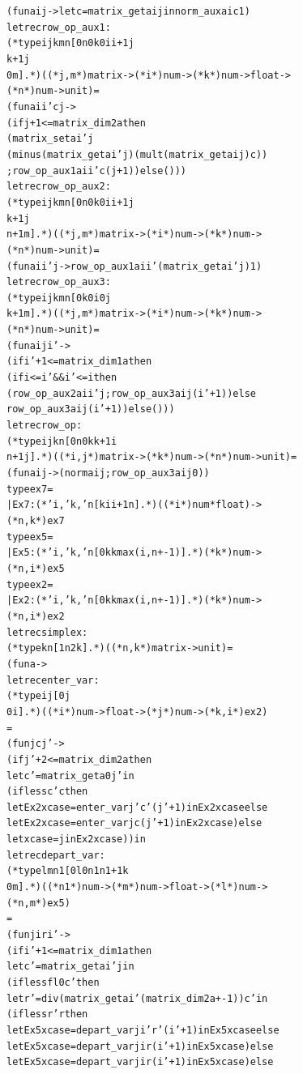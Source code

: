 \documentclass{article}
\newenvironment{tmcode}[1][]{\begin{alltt}}{\end{alltt}}
\begin{document}
\begin{tmcode}
  (fun a i j -> let c = matrix_get a i j in norm_aux a i c 1)
let rec row_op_aux1 :
  (*type i j k m n [0  n  0  k  0  i  i + 1  j 
    k + 1  j 
    0  m].*) ((* j, m *) matrix -> (* i *) num -> (* k *) num -> float ->
                  (* n *) num -> unit) =
  (fun a i i' c j ->
    (if j + 1 <= matrix_dim2 a then
    (matrix_set a i' j
       (minus (matrix_get a i' j) (mult (matrix_get a i j) c))
    ; row_op_aux1 a i i' c (j + 1)) else ()))
let rec row_op_aux2 :
  (*type i j k m n [0  n  0  k  0  i  i + 1  j 
    k + 1  j 
    n + 1  m].*) ((* j, m *) matrix -> (* i *) num -> (* k *) num ->
                      (* n *) num -> unit) =
  (fun a i i' j -> row_op_aux1 a i i' (matrix_get a i' j) 1)
let rec row_op_aux3 :
  (*type i j k m n [0  k  0  i  0  j 
    k + 1  m].*) ((* j, m *) matrix -> (* i *) num -> (* k *) num ->
                      (* n *) num -> unit) =
  (fun a i j i' ->
    (if i' + 1 <= matrix_dim1 a then
    (if i <= i'&& i' <= i then
    (row_op_aux2 a i i' j ; row_op_aux3 a i j (i' + 1)) else
    row_op_aux3 a i j (i' + 1)) else ()))
let rec row_op :
  (*type i j k n [0  n  0  k  k + 1  i 
    n + 1  j].*) ((* i, j *) matrix -> (* k *) num -> (* n *) num -> unit) =
  (fun a i j -> (norm a i j ; row_op_aux3 a i j 0))
type ex7 =
  | Ex7 : (*'i, 'k, 'n[k  i  i + 1  n].*)((* i *) num * float) ->
    (* n, k *) ex7
type ex5 =
  | Ex5 : (*'i, 'k, 'n[0  k  kmax (i, n + -1)].*)(* k *) num ->
    (* n, i *) ex5
type ex2 =
  | Ex2 : (*'i, 'k, 'n[0  k  kmax (i, n + -1)].*)(* k *) num ->
    (* n, i *) ex2
let rec simplex :
  (*type k n [1  n  2  k].*) ((* n, k *) matrix -> unit) =
  (fun a ->
    let rec enter_var :
    (*type i j [0  j 
      0  i].*) ((* i *) num -> float -> (* j *) num -> (* k, i *) ex2)
    =
    (fun j c j' ->
      (if j' + 2 <= matrix_dim2 a then
      let c' = matrix_get a 0 j' in
      (if less c' c then
      let Ex2 xcase = enter_var j' c' (j' + 1) in Ex2 xcase else
      let Ex2 xcase = enter_var j c (j' + 1) in Ex2 xcase) else
      let xcase = j in Ex2 xcase)) in
    let rec depart_var :
    (*type l m n1 [0  l  0  n1  n1 + 1  k 
      0  m].*) ((* n1 *) num -> (* m *) num -> float -> (* l *) num ->
                    (* n, m *) ex5)
    =
    (fun j i r i' ->
      (if i' + 1 <= matrix_dim1 a then
      let c' = matrix_get a i' j in
      (if less fl0 c' then
      let r' = div (matrix_get a i' (matrix_dim2 a + -1)) c' in
      (if less r' r then
      let Ex5 xcase = depart_var j i' r' (i' + 1) in Ex5 xcase else
      let Ex5 xcase = depart_var j i r (i' + 1) in Ex5 xcase) else
      let Ex5 xcase = depart_var j i r (i' + 1) in Ex5 xcase) else

\end{tmcode}
\end{document}
